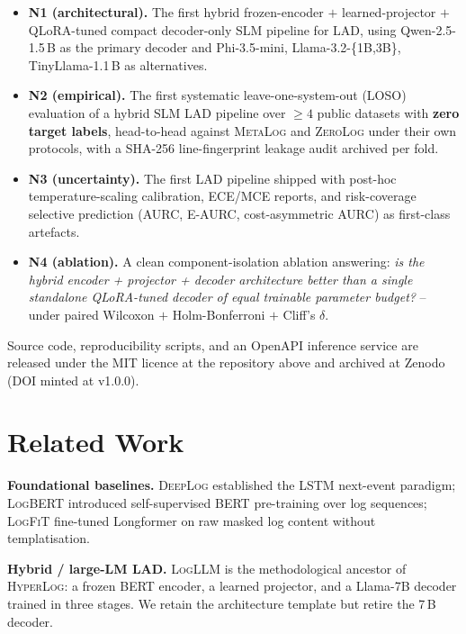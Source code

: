 \documentclass[journal, twoside]{IEEEtran}
\newcommand{\hylog}{\textsc{HyperLog}}
\newcommand{\loso}{\textsc{LOSO}}
\newcommand{\ece}{\textsc{ECE}}
\newcommand{\aurc}{\textsc{AURC}}
\newcommand{\eaurc}{\textsc{E-AURC}}
\begin{document}
\begin{itemize}
\item \textbf{N1 (architectural).} The first hybrid frozen-encoder
$+$ learned-projector $+$ \mbox{QLoRA-tuned} compact decoder-only SLM
pipeline for LAD, using Qwen-2.5-1.5\,B as the primary decoder and
Phi-3.5-mini, Llama-3.2-\{1B,3B\}, TinyLlama-1.1\,B as alternatives.
\item \textbf{N2 (empirical).} The first systematic
leave-one-system-out (\loso) evaluation of a hybrid SLM LAD pipeline
over $\ge 4$ public datasets with \textbf{zero target labels},
head-to-head against \textsc{MetaLog} and \textsc{ZeroLog} under their
own protocols, with a SHA-256 line-fingerprint leakage audit archived
per fold.
\item \textbf{N3 (uncertainty).} The first LAD pipeline shipped with
post-hoc temperature-scaling calibration, \ece{}/\textsc{MCE} reports,
and risk-coverage selective prediction (\aurc{}, \eaurc{},
cost-asymmetric \aurc{}) as first-class artefacts.
\item \textbf{N4 (ablation).} A clean component-isolation ablation
answering: \emph{is the hybrid encoder + projector + decoder
architecture better than a single standalone QLoRA-tuned decoder of
equal trainable parameter budget?} -- under paired Wilcoxon $+$
Holm-Bonferroni $+$ Cliff's $\delta$.
\end{itemize}

Source code, reproducibility scripts, and an OpenAPI inference service
are released under the MIT licence at the repository above and
archived at Zenodo (DOI minted at v1.0.0).

\section{Related Work}\label{sec:related}

\textbf{Foundational baselines.} \textsc{DeepLog} \cite{deeplog2017}
established the LSTM next-event paradigm; \textsc{LogBERT}
\cite{logbert2021} introduced self-supervised BERT pre-training over
log sequences; \textsc{LogFiT} \cite{logfit2024} fine-tuned Longformer
on raw masked log content without templatisation.

\textbf{Hybrid / large-LM LAD.} \textsc{LogLLM} \cite{logllm2024} is
the methodological ancestor of \hylog: a frozen BERT encoder, a
learned projector, and a Llama-7B decoder trained in three stages.
We retain the architecture template but retire the 7\,B decoder.
\end{document}
